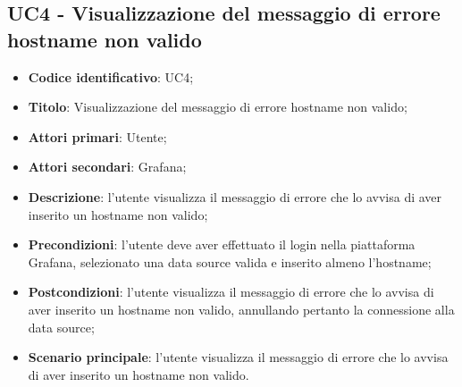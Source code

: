 \subsection{UC4 - Visualizzazione del messaggio di errore hostname non valido}
\begin{itemize}
    \item \textbf{Codice identificativo}: UC4;
    \item \textbf{Titolo}: Visualizzazione del messaggio di errore hostname non valido;
    \item \textbf{Attori primari}: Utente;
    \item \textbf{Attori secondari}: Grafana\glo;
    \item \textbf{Descrizione}: l'utente visualizza il messaggio di errore che lo avvisa di aver inserito un hostname non valido;
    \item \textbf{Precondizioni}: l'utente deve aver effettuato il login nella piattaforma Grafana\glo, selezionato una data source valida e inserito almeno l'hostname;
    \item \textbf{Postcondizioni}: l'utente visualizza il messaggio di errore che lo avvisa di aver inserito un hostname non valido, annullando pertanto la connessione                                  alla data source;
    \item \textbf{Scenario principale}: l'utente visualizza il messaggio di errore che lo avvisa di aver inserito un hostname non valido.
\end{itemize}
